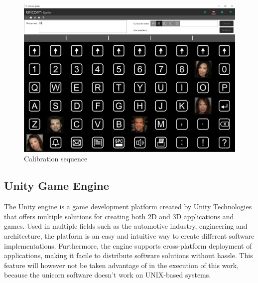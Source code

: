 \begin{figure}[H]
  \centering
  \includegraphics[width=1\textwidth]{Graphics/Speller Calibration.png}
  \caption{Calibration sequence}
  \label{fig:speller calibration sequence}
\end{figure}
\vspace{\baselineskip}


\subsection{Unity Game Engine}
The Unity engine is a game development platform created by Unity Technologies that offers multiple solutions for creating both 2D and 3D applications and games. Used in multiple fields such as the automotive industry, engineering and architecture\cite{Unity_engine}, the platform is an easy and intuitive way to create different software implementations. Furthermore, the engine supports cross-platform deployment of applications, making it facile to distribute software solutions without hassle. This feature will however not be taken advantage of in the execution of this work, because the unicorn software doesn't work on UNIX-based systems\cite{UnicornSuite_Manual}.
\vspace{\baselineskip}


